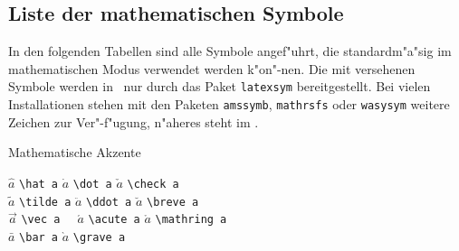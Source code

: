 
\subsection{Liste der mathematischen Symbole}  \label{symbols}
\begingroup %
\renewcommand{\thefootnote}{\fnsymbol{footnote}} 

In den folgenden Tabellen sind alle Symbole angef"uhrt, die
standard\-m"a"sig im mathematischen Modus verwendet werden
k"on"-nen.  Die mit \null\footnotemark[1] versehenen Symbole werden
in \LaTeXe\ nur durch das Paket \texttt{latexsym} bereitgestellt.  Bei
vielen Installationen stehen mit den Paketen \texttt{amssymb}, 
\texttt{mathrsfs} oder \texttt{wasysym} weitere Zeichen zur 
Ver"-f"ugung, n"aheres steht im \local.


\begin{table}[hbp]
\caption{Mathematische Akzente}  \label{mathakz}
\begin{symbols}
$\hat a$    \> \verb|\hat a|   \> $\dot a$   \> \verb|\dot a|   \> $\check a$    \> \verb|\check a|    \\ 
$\tilde a$  \> \verb|\tilde a| \> $\ddot a$  \> \verb|\ddot a|  \> $\breve a$    \> \verb|\breve a|    \\
$\vec a$    \> \verb|\vec a  | \> $\acute a$ \> \verb|\acute a| \> $\mathring a$ \> \verb|\mathring a| \\
$\bar a$    \> \verb|\bar a|   \> $\grave a$ \> \verb|\grave a| \\
\end{symbols}
\end{table}

